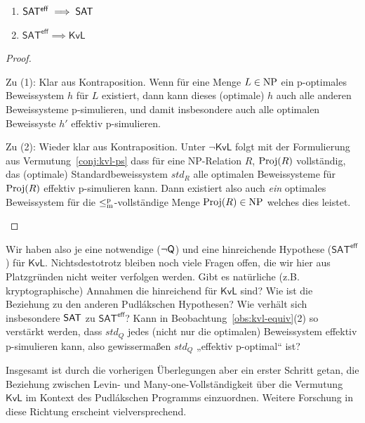 \begin{theorem}\label{thm:sateff-generalizes-sat}
    \begin{enumerate}
        \item $\mathsf{SAT^{eff}}\implies \mathsf{SAT}$
        \item $\mathsf{SAT^{eff}}\implies \mathsf{KvL}$
    \end{enumerate}
\end{theorem}
\begin{proof}
\begin{prooflist}
\item Zu (1): Klar aus Kontraposition. Wenn für eine Menge $L\in\mathrm{NP}$ ein p-optimales Beweissystem $h$ für $L$ existiert, dann kann dieses (optimale) $h$ auch alle anderen Beweissysteme p-simulieren, und damit insbesondere auch alle optimalen Beweissyste $h'$ effektiv p-simulieren.

\item Zu (2): Wieder klar aus Kontraposition. Unter $\neg\mathsf{KvL}$ folgt mit der Formulierung aus Vermutung~\ref{conj:kvl-ps} dass für eine NP-Relation $R$, $\operatorname{Proj}(R)$ vollständig, das (optimale) Standardbeweissystem $\mathit{std}_R$ alle optimalen Beweissysteme für $\operatorname{Proj}(R)$ effektiv p-simulieren kann. Dann existiert also auch \emph{ein} optimales Beweissystem für die $\leq_\mathrm{m}^\mathrm{p}$-vollständige Menge $\operatorname{Proj}(R)\in\mathrm{NP}$ welches dies leistet.
\end{prooflist}
\end{proof}

Wir haben also je eine notwendige ($\neg\mathsf{Q}$) und eine hinreichende Hypothese ($\mathsf{SAT^{eff}}$) für $\mathsf{KvL}$. 
Nichtsdestotrotz bleiben noch viele Fragen offen, die wir hier aus Platzgründen nicht weiter verfolgen werden. 
Gibt es natürliche (z.B. kryptographische) Annahmen die hinreichend für $\mathsf{KvL}$ sind? Wie ist die Beziehung zu den anderen Pudlákschen Hypothesen? Wie verhält sich insbesondere $\mathsf{SAT}$ zu $\mathsf{SAT^{eff}}$? 
Kann in Beobachtung~\ref{obs:kvl-equiv}(2) so verstärkt werden, dass $\mathit{std}_Q$ jedes (nicht nur die optimalen) Beweissystem effektiv p-simulieren kann, also gewissermaßen $\mathit{std}_Q$ „effektiv p-optimal“ ist?

Insgesamt ist durch die vorherigen Überlegungen aber ein erster Schritt getan, die Beziehung zwischen Levin- und Many-one-Vollständigkeit über die Vermutung $\mathsf{KvL}$ im Kontext des Pudlákschen Programms einzuordnen.
Weitere Forschung in diese Richtung erscheint vielversprechend.

